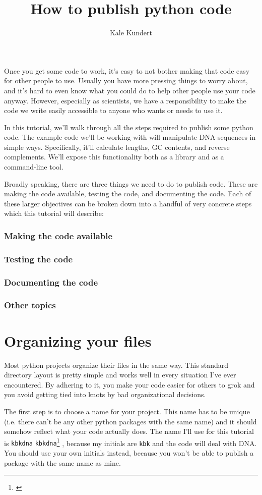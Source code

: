 \documentclass{article}
\makeatletter
\newcommand\organizedtoc{%
    \subsubsection*{Making the code available}\@starttoc{use}%
    \subsubsection*{Testing the code}\@starttoc{test}%
    \subsubsection*{Documenting the code}\@starttoc{doc}%
    \subsubsection*{Other topics}\@starttoc{misc}}
\newcommand\organizedsection[2]{
 \section{#2}
 \addcontentsline{#1}{section}{#2}
 \setcounter{footnote}{1}}
\newcommand{\link}[2]{#1\footnote{\url{#2}}}
\newcommand{\module}[2][]{%
 \ifthenelse{\isempty{#1}}%
 {\texttt{#2}}%
 {\link{\texttt{#2}}{#1}}%
}
\makeatother
\begin{document}
\title{How to publish python code}
\author{Kale Kundert}
\maketitle{}

Once you get some code to work, it's easy to not bother making that code easy 
for other people to use.  Usually you have more pressing things to worry about, 
and it's hard to even know what you could do to help other people use your code 
anyway.  However, especially as scientists, we have a responsibility to make 
the code we write easily accessible to anyone who wants or needs to use it.

In this tutorial, we'll walk through all the steps required to publish some 
python code.  The example code we'll be working with will manipulate DNA 
sequences in simple ways.  Specifically, it'll calculate lengths, GC contents, 
and reverse complements.  We'll expose this functionality both as a library and 
as a command-line tool.

Broadly speaking, there are three things we need to do to publish code.  These 
are making the code available, testing the code, and documenting the code.  
Each of these larger objectives can be broken down into a handful of very 
concrete steps which this tutorial will describe:

\organizedtoc

\organizedsection{use}{Organizing your files}

Most python projects organize their files in the same way.  This standard 
directory layout is pretty simple and works well in every situation I've ever 
encountered.  By adhering to it, you make your code easier for others to grok 
and you avoid getting tied into knots by bad organizational decisions.

The first step is to choose a name for your project.  This name has to be 
unique (i.e. there can't be any other python packages with the same name) and 
it should somehow reflect what your code actually does.  The name I'll use for 
this tutorial is \module{kbkdna}, because my initials are \texttt{kbk} and the 
code will deal with DNA.  You should use your own initials instead, because you 
won't be able to publish a package with the same name as mine.

\begin{listing}[h]
\end{listing}
\end{document}
